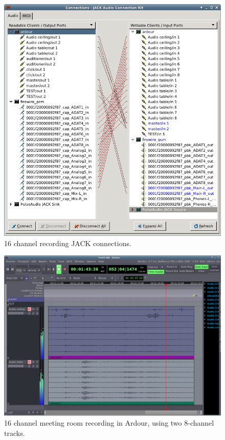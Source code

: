 \documentclass[oneside,english]{scrbook}
\begin{document}
\begin{figure}
  \centering
  \includegraphics[width=\columnwidth]{figs/jack-connect.png}
  \caption{16 channel recording JACK connections.}
  \label{fig:jack-connect}
\end{figure}

\begin{figure}
  \centering
  \includegraphics[width=\columnwidth]{figs/ardour.png}
  \caption{16 channel meeting room recording in Ardour, using two 8-channel tracks.}
  \label{fig:ardour}
\end{figure}
\end{document}
